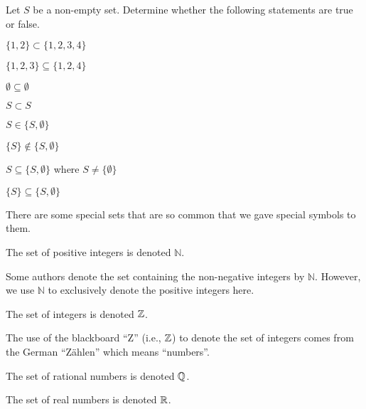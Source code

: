 \begin{exercise}
    Let $S$ be a non-empty set. Determine whether the following statements are true or false.
    \begin{multicols}{2}
        \begin{partquestions}{\alph*}
            \item $\{1, 2\} \subset \{1, 2, 3, 4\}$
            \item $\{1, 2, 3\} \subseteq \{1, 2, 4\}$
            \item $\emptyset \subseteq \emptyset$
            \item $S \subset S$
            \item $S \in \{S, \emptyset\}$
            \item $\{S\} \notin \{S, \emptyset\}$
            \item $S \subseteq \{S, \emptyset\}$ where $S \neq \{\emptyset\}$
            \item $\{S\} \subseteq \{S, \emptyset\}$
        \end{partquestions}
    \end{multicols}
\end{exercise}

There are some special sets that are so common that we gave special symbols to them.
\begin{definition}
    The set of positive integers is denoted $\mathbb{N}$.
\end{definition}
\begin{remark}
    Some authors denote the set containing the non-negative integers by $\mathbb{N}$. However, we use $\mathbb{N}$ to exclusively denote the positive integers here.
\end{remark}

\begin{definition}
    The set of integers  is denoted $\mathbb{Z}$.
\end{definition}
\begin{remark}
    The use of the blackboard ``Z'' (i.e., $\mathbb{Z}$) to denote the set of integers comes from the German ``Z\"ahlen'' which means ``numbers''.
\end{remark}

\begin{definition}
    The set of rational numbers is denoted $\mathbb{Q}$.
\end{definition}

\begin{definition}
    The set of real numbers is denoted $\mathbb{R}$.
\end{definition}


